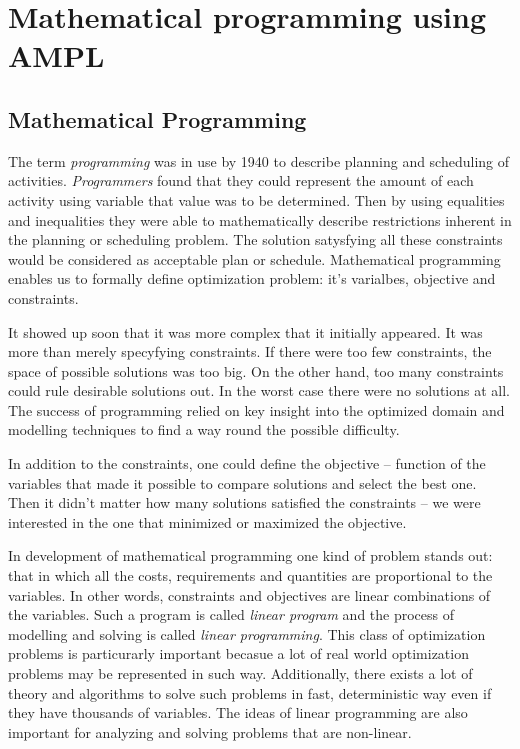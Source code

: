\chapter{Mathematical programming using AMPL}
\label{chap:ampl} 


\section{Mathematical Programming}

The term \emph{programming} was in use by 1940 to describe planning and scheduling of activities. \emph{Programmers} found that they could represent the amount of each activity using variable that value was to be determined. Then by using equalities and inequalities they were able to mathematically describe restrictions inherent in the planning or scheduling problem. The solution satysfying all these constraints would be considered as acceptable plan or schedule. Mathematical programming enables us to formally define optimization problem: it's varialbes, objective and constraints.

It showed up soon that it was more complex that it initially appeared. It was more than merely specyfying constraints. If there were too few constraints, the space of possible solutions was too big. On the other hand, too many constraints could rule desirable solutions out. In the worst case there were no solutions at all. The success of programming relied on key insight into the optimized domain and modelling techniques to find a way round the possible difficulty. 

In addition to the constraints, one could define the objective – function of the variables that made it possible to compare solutions and select the best one. Then it didn't matter how many solutions satisfied the constraints -- we were interested in the one that minimized or maximized the objective.

In development of mathematical programming one kind of problem stands out: that in which all the costs, requirements and quantities are proportional to the variables. In other words, constraints and objectives are linear combinations of the variables. Such a program is called \emph{linear program} and the process of modelling and solving is called \emph{linear programming}. This class of optimization problems is particurarly important becasue a lot of real world optimization problems may be represented in such way. Additionally, there exists a lot of theory and algorithms to solve such problems in fast, deterministic way even if they have thousands of variables. The ideas of linear programming are also important for analyzing and solving problems that are non-linear.


